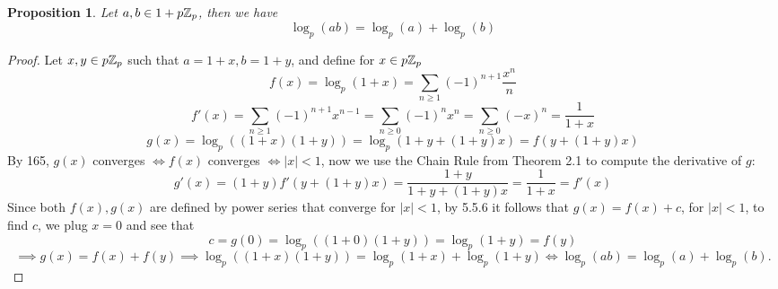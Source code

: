 \documentclass[a4paper]{article}
\theoremstyle{plain}
\newtheorem{prop}[thm]{Proposition}
\theoremstyle{definition}
\begin{document}
\begin{prop}
  Let $a, b \in 1+p\Bbb Z_{p}$, then we have
  $$\log_{p}(ab) = \log_{p}(a) + \log_{p}(b)$$
\end{prop}
\begin{proof}
  Let $x, y \in p\Bbb Z_{p}$ such that $a= 1+x, b =1+y$, and define for $x \in p\Bbb Z_{p}$
  $$f(x) = \log_{p}(1+x) = \sum_{n \geq 1}(-1)^{n+1}\frac {x^{n}}{n}$$
  $$f'(x) = \sum_{n \geq 1} (-1)^{n+1}x^{n-1} = \sum_{n \geq 0} (-1)^{n}x^{n} = \sum_{n \geq 0}(-x)^{n} = \frac{1}{1+x}$$
  $$g(x) = \log_{p}((1+x)(1+y)) = \log_{p}(1+y + (1+y)x) = f(y + (1+y)x)$$
  By 165, $g(x)$ converges $\iff f(x)$ converges $\iff |x| < 1$, now we use the Chain Rule from Theorem 2.1 to compute the derivative of $g$:
  $$g'(x) = (1+y)f'(y+(1+y)x) = \frac{1+y}{1+y+(1+y)x} = \frac{1}{1+x} = f'(x)$$
  Since both $f(x), g(x)$ are defined by power series that converge for $|x| < 1$, by 5.5.6 it follows that
  $g(x) = f(x) + c$, for $|x| < 1$, to find $c$, we plug $x=0$ and see that
  $$c = g(0) = \log_{p}((1+0)(1+y)) = \log_{p}(1+y) = f(y)$$
  $$ \implies g(x) = f(x) + f(y) \implies \log_{p}((1+x)(1+y)) = \log_{p}(1+x) + \log_{p}(1+y) \iff \log_{p}(ab) = \log_{p}(a) + \log_{p}(b).$$
\end{proof}
\end{document}
